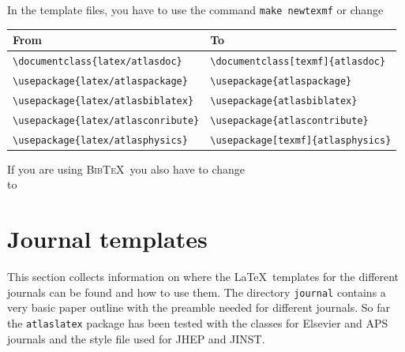 \documentclass[atlasstyle,UKenglish]{latex/atlasdoc}
\newcommand{\BibTeX}{\textsc{Bib\TeX}}
\newcommand{\File}[1]{\texttt{#1}\xspace}
\newcommand{\Package}[1]{\texttt{#1}\xspace}
\begin{document}
In the template files, you have to use the command \texttt{make newtexmf} or change
\begin{center}
  \begin{tabular}{ll}
    From & To \\
    \midrule
    \verb|\documentclass{latex/atlasdoc}|    & \verb|\documentclass[texmf]{atlasdoc}| \\
    \verb|\usepackage{latex/atlaspackage}|   & \verb|\usepackage{atlaspackage}| \\
    \verb|\usepackage{latex/atlasbiblatex}|   & \verb|\usepackage{atlasbiblatex}| \\
    \verb|\usepackage{latex/atlasconribute}| & \verb|\usepackage{atlascontribute}| \\
    \verb|\usepackage{latex/atlasphysics}|   & \verb|\usepackage[texmf]{atlasphysics}|
  \end{tabular}
\end{center}

If you are using \BibTeX\ you also have to change\\
\verb|| to\\
\verb||


\section{Journal templates}
\label{sec:journal}

This section collects information on where the \LaTeX\ templates for the different journals can be found and how to use them.
The directory \File{journal} contains a very basic paper outline with the preamble needed for different journals.
So far the \Package{atlaslatex} package has been tested with the classes for Elsevier and APS journals and the style file used for JHEP and JINST.
\end{document}
